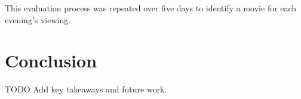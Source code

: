 \documentclass[12pt,a4paper]{article}
\begin{document}
  \noindent This evaluation process was repeated over five days to identify a movie for each evening’s viewing.


  \section{Conclusion}

  TODO Add key takeaways and future work.
\end{document}

